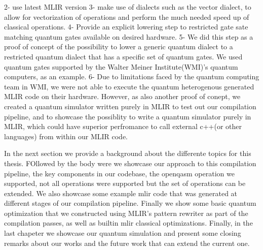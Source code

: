 2- use latest MLIR version
3- make use of dialects such as the vector dialect, to allow for vectorization of 
operations and perform the much needed speed up of classical operations.
4- Provide an explicit lowering step to restricted gate sate matching quantum gates
available on desired hardware.
5- We did this step as a proof of concept of the possibility to lower a generic quantum dialect
to a restricted quantum dialect that has a specific set of quantum gates. We used quantum gates
supported by the Walter Meiner Institute(WMI)'s quantum computers, as an example.
6- Due to limitations faced by the quantum computing team in WMI, we were not able to execute
the quantum heterogenous generated MLIR code on their hardware.
However, as also another proof of conept, we created a quantum simulator written purely in MLIR
to test out our compilation pipeline, and to showcase the possiblity to write a quantum simulator purely in MLIR,
which could have superior perfromance to call external c++(or other languages) from within our MLIR code.

In the next section we provide a background about the differente topics for this thesis. 
FOllowed by the body were we showcase our approach to this
compilation pipeline, the key components in our codebase, the openqasm operation we 
supported, not all operations were supported but the set of operations can be extended. We also showcase
some example mlir code that was generated at 
different stages of our compilation pipeline.
Finally we show some basic quantum optimization that
we constructed using MLIR's pattern rewriter as part of the compilation passes,
as well as builtin mlir classical optimizations.
Finally, in the last chapeter we showcase our quantum
simulation and present some closing remarks about our works
and the future work that can extend the current one.




